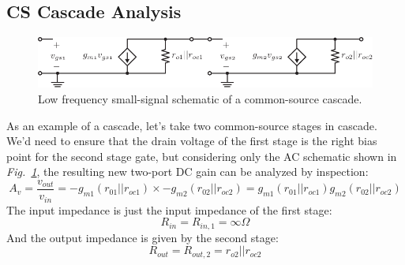 \subsection{CS Cascade Analysis}
\begin{figure}[tb]
\centering
\includegraphics[scale=1]{2cs_casc_ss}
\caption{Low frequency small-signal schematic of a common-source cascade.}
\label{fig:2cs_casc_ss}
\end{figure}
As an example of a cascade, let's take two common-source stages in cascade.  We'd need to ensure that the drain voltage of the first stage is the right bias point for the second stage gate, but considering only the AC schematic shown in \emph{Fig.~\ref{fig:2cs_casc_ss}}, the resulting new two-port DC gain can be analyzed by inspection:
    \begin{equation}
        A_v = \frac{v_{out}}{v_{in}} = -g_{m1} (r_{01}||r_{oc1}) \times  -g_{m2} (r_{02}||r_{oc2}) = g_{m1} (r_{01}||r_{oc1}) g_{m2} (r_{02}||r_{oc2})
    \end{equation}
The input impedance is just the input impedance of the first stage:
    \begin{equation}
        R_{in} = R_{in,1} = \infty\Omega 
    \end{equation} 
And the output impedance is given by the second stage:
    \begin{equation}
        R_{out} = R_{out,2} = r_{o2} || r_{oc2} 
    \end{equation}
